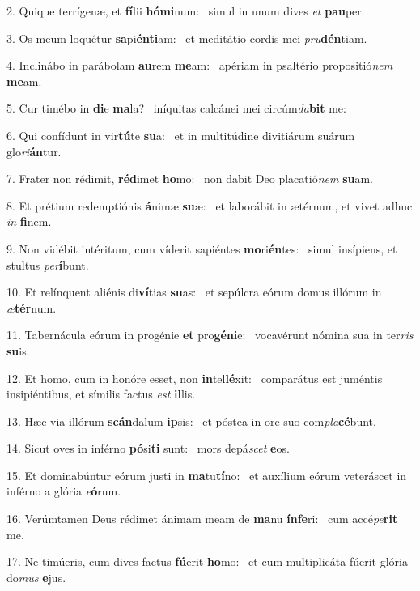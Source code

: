 2. Quique terrígenæ, et \textbf{fí}lii \textbf{hó}\textbf{mi}num: \ast\  simul in unum dives \textit{et} \textbf{pau}per.\

3. Os meum loquétur \textbf{sa}pi\textbf{én}\textbf{ti}am: \ast\  et meditátio cordis mei \textit{pru}\textbf{dén}tiam.\

4. Inclinábo in parábolam \textbf{au}rem \textbf{me}am: \ast\  apériam in psaltério propositió\textit{nem} \textbf{me}am.\

5. Cur timébo in \textbf{di}e \textbf{ma}la? \ast\  iníquitas calcánei mei circúm\textit{da}\textbf{bit} me:\

6. Qui confídunt in vir\textbf{tú}te \textbf{su}a: \ast\  et in multitúdine divitiárum suárum glo\textit{ri}\textbf{án}tur.\

7. Frater non rédimit, \textbf{réd}imet \textbf{ho}mo: \ast\  non dabit Deo placatió\textit{nem} \textbf{su}am.\

8. Et prétium redemptiónis \textbf{á}nimæ \textbf{su}æ: \ast\  et laborábit in ætérnum, et vivet adhuc \textit{in} \textbf{fi}nem.\

9. Non vidébit intéritum, cum víderit sapiéntes \textbf{mo}ri\textbf{én}tes: \ast\  simul insípiens, et stultus \textit{per}\textbf{í}bunt.\

10. Et relínquent aliénis di\textbf{ví}tias \textbf{su}as: \ast\  et sepúlcra eórum domus illórum in \textit{æ}\textbf{tér}num.\

11. Tabernácula eórum in progénie \textbf{et} pro\textbf{gé}\textbf{ni}e: \ast\  vocavérunt nómina sua in ter\textit{ris} \textbf{su}is.\

12. Et homo, cum in honóre esset, non \textbf{in}tel\textbf{lé}xit: \ast\  comparátus est juméntis insipiéntibus, et símilis factus \textit{est} \textbf{il}lis.\

13. Hæc via illórum \textbf{scán}dalum \textbf{ip}sis: \ast\  et póstea in ore suo com\textit{pla}\textbf{cé}bunt.\

14. Sicut oves in inférno \textbf{pó}si\textbf{ti} sunt: \ast\  mors depá\textit{scet} \textbf{e}os.\

15. Et dominabúntur eórum justi in \textbf{ma}tu\textbf{tí}no: \ast\  et auxílium eórum veteráscet in inférno a glória \textit{e}\textbf{ó}rum.\

16. Verúmtamen Deus rédimet ánimam meam de \textbf{ma}nu \textbf{ín}\textbf{fe}ri: \ast\  cum accé\textit{pe}\textbf{rit} me.\

17. Ne timúeris, cum dives factus \textbf{fú}erit \textbf{ho}mo: \ast\  et cum multiplicáta fúerit glória do\textit{mus} \textbf{e}jus.\

